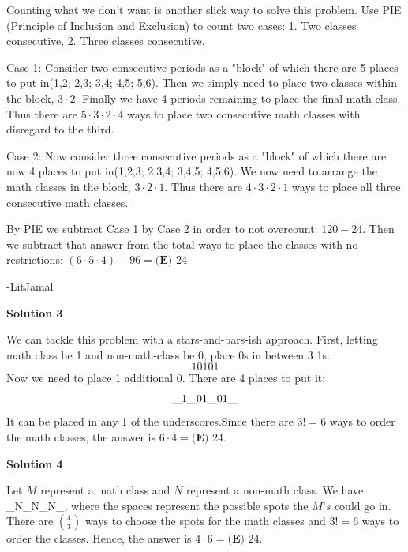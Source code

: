 \begin{enumerate}
Counting what we don't want is another slick way to solve this problem. Use PIE (Principle of Inclusion and Exclusion) to count two cases: 1. Two classes consecutive, 2. Three classes consecutive. 

 Case 1: Consider two consecutive periods as a "block" of which there are 5 places to put in(1,2; 2,3; 3,4; 4,5; 5,6). Then we simply need to place two classes within the block, $3 \cdot 2$. Finally we have 4 periods remaining to place the final math class. Thus there are $5 \cdot 3 \cdot 2 \cdot 4$ ways to place two consecutive math classes with disregard to the third. 

 Case 2: Now consider three consecutive periods as a "block" of which there are now 4 places to put in(1,2,3; 2,3,4; 3,4,5; 4,5,6). We now need to arrange the math classes in the block, $3 \cdot 2 \cdot 1$. Thus there are $4 \cdot 3 \cdot 2 \cdot 1$ ways to place all three consecutive math classes. 

 By PIE we subtract Case 1 by Case 2 in order to not overcount:  $120-24$. Then we subtract that answer from the total ways to place the classes with no restrictions: $(6 \cdot 5 \cdot 4) - 96= \boxed{\textbf{(E) } 24}$

 -LitJamal

 



\textbf{Solution 3}

We can tackle this problem with a stars-and-bars-ish approach. First, letting math class be 1 and non-math-class be 0, place 0s in between 3 1s:
 \[10101\]Now we need to place 1 additional 0. There are 4 places to put it: 
 \[\underline{\hspace{0.3cm}}1\underline{\hspace{0.3cm}}01\underline{\hspace{0.3cm}}01\underline{\hspace{0.3cm}}\] It can be placed in any 1 of the underscores.Since there are $3!=6$ ways to order the math classes, the answer is $6\cdot 4=\boxed{\textbf{(E) } 24}$.

 



\textbf{Solution 4}

Let $M$ represent a math class and $N$ represent a non-math class. We have \_N\_N\_N\_, where the spaces represent the possible spots the $M’s$ could go in. There are $4\choose 3$ ways to choose the spots for the math classes and $3!=6$ ways to order the classes. Hence, the answer is $4 \cdot 6 = \boxed{\textbf{(E) } 24}$.


\end{enumerate}
